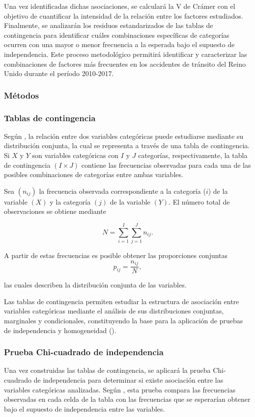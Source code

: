 \documentclass[12pt]{article}
\begin{document}
Una vez identificadas dichas asociaciones, se calculará la V de Crámer con el objetivo de cuantificar la intensidad de la relación entre los factores
estudiados. Finalmente, se analizarán los residuos estandarizados de las tablas de contingencia para identificar cuáles combinaciones específicas de
categorías ocurren con una mayor o menor frecuencia a la esperada bajo el supuesto de independencia. 
Este proceso metodológico permitirá identificar y caracterizar las combinaciones de factores más frecuentes en los accidentes de 
tránsito del Reino Unido durante el período 2010-2017.

\subsubsection{Métodos}
\subsubsection*{Tablas de contingencia}
Según \textcite{Agresti2002}, la relación entre dos variables categóricas puede estudiarse mediante su distribución conjunta, 
la cual se representa a través de una tabla de contingencia. Si $X$ y $Y$ son variables categóricas con $I$ y $J$ categorías, 
respectivamente, la tabla de contingencia $(I \times J)$ contiene las frecuencias observadas para cada una de las posibles combinaciones de 
categorías entre ambas variables.

Sea $(n_{ij})$ la frecuencia observada correspondiente a la categoría ($i$) de la variable $(X)$ y la categoría $(j)$ de la variable $(Y)$. 
El número total de observaciones se obtiene mediante

$$
N=\sum_{i=1}^{I}\sum_{j=1}^{J}n_{ij}.
$$

A partir de estas frecuencias es posible obtener las proporciones conjuntas
$$
p_{ij}=\frac{n_{ij}}{N},
$$

las cuales describen la distribución conjunta de las variables. 

Las tablas de contingencia permiten estudiar la estructura de asociación entre 
variables categóricas mediante el análisis de sus distribuciones conjuntas, marginales 
y condicionales, constituyendo la base para la aplicación de pruebas de independencia y homogeneidad (\cite{LASTRE2019}).

\subsubsection*{Prueba Chi-cuadrado de independencia}
Una vez construidas las tablas de contingencia, se aplicará la prueba Chi-cuadrado de independencia para determinar si existe asociación entre las variables categóricas analizadas. Según \textcite{LASTRE2019}, esta prueba compara las frecuencias observadas en cada celda de la tabla con las frecuencias que se esperarían obtener bajo el supuesto de independencia entre las variables.
\end{document}
